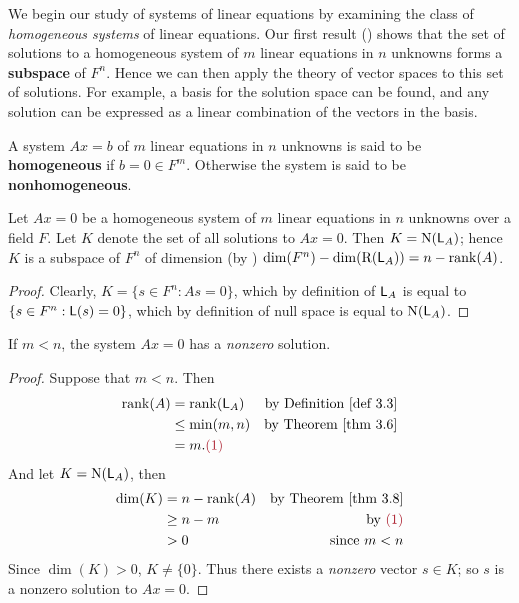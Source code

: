 We begin our study of systems of linear equations by examining the class of \emph{homogeneous systems} of linear equations.
Our first result () shows that the set of solutions to a homogeneous system of \(m\) linear equations in \(n\) unknowns forms a \textbf{subspace} of \(F^n\).
Hence we can then apply the theory of vector spaces to this set of solutions.
For example, a basis for the solution space can be found, and any solution can be expressed as a linear combination of the vectors in the basis.

\begin{definition} \label{def 3.5}
A system \(Ax = b\) of \(m\) linear equations in \(n\) unknowns is said to be \textbf{homogeneous} if \(b = 0 \in F^m\).
Otherwise the system is said to be \textbf{nonhomogeneous}.
\end{definition}

\begin{theorem} \label{thm 3.8}
Let \(Ax = 0\) be a homogeneous system of \(m\) linear equations in \(n\) unknowns over a field \(F\).
Let \(K\) denote the set of all solutions to \(Ax = 0\).
Then \(K = \mathrm{N}(\textsf{L}_A)\);
hence \(K\) is a subspace of \(F^n\) of dimension (by ) \(\dim(F^n) - \dim(\mathrm{R}(\textsf{L}_A)) = n - \mathrm{rank}(A)\).
\end{theorem}

\begin{proof}
Clearly, \(K = \{s \in F^n : As = 0 \}\), which by definition of \(\textsf{L}_A\) is equal to \(\{s \in F^n : \textsf{L}(s) = 0 \}\), which by definition of null space is equal to \(\mathrm{N}(\textsf{L}_A)\).
\end{proof}

\begin{corollary} \label{corollary 3.8.1}
If \(m < n\), the system \(Ax = 0\) has a \emph{nonzero} solution.
\end{corollary}

\begin{proof}
Suppose that \(m < n\).
Then
\begin{align*}
    \rank(A) & = \rank(\LMTRAN_A) & \text{by \DEF{3.3}} \\
             & \le \min(m, n) & \text{by \THM{3.6}} \\
             & = m. \MAROON{(1)}
\end{align*}
And let \(K = \mathrm{N}(\textsf{L}_A)\), then
\begin{align*}
    \dim(K) & = n - \rank(A) & \text{by \THM{3.8}} \\
            & \ge n - m & \text{by \MAROON{(1)}} \\
            & > 0 & \text{since \(m < n\)}
\end{align*}
Since \(\dim(K) > 0\), \(K \ne \{ 0 \}\).
Thus there exists a \emph{nonzero} vector \(s \in K\);
so \(s\) is a nonzero solution to \(Ax = 0\).
\end{proof}

